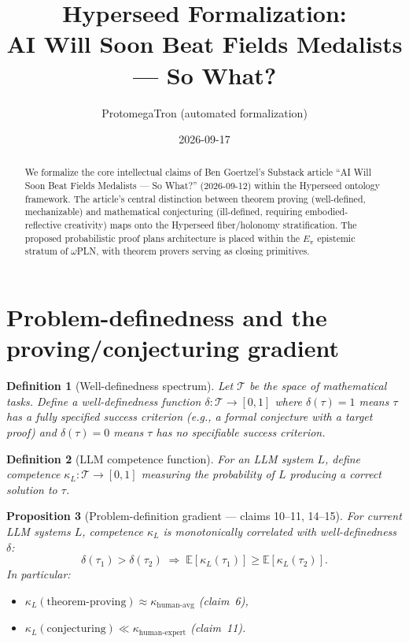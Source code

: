 \documentclass[11pt,a4paper]{article}
\title{Hyperseed Formalization:\\
  AI Will Soon Beat Fields Medalists --- So What?}
\author{ProtomegaTron (automated formalization)}
\date{2026-09-17}
\newtheorem{definition}{Definition}[section]
\newtheorem{proposition}[definition]{Proposition}
\begin{document}
\maketitle

\begin{abstract}
We formalize the core intellectual claims of Ben Goertzel's Substack article
``AI Will Soon Beat Fields Medalists --- So What?'' (2026-09-12) within the
Hyperseed ontology framework. The article's central distinction between
theorem proving (well-defined, mechanizable) and mathematical conjecturing
(ill-defined, requiring embodied-reflective creativity) maps onto the
Hyperseed fiber/holonomy stratification. The proposed probabilistic proof
plans architecture is placed within the $E_\pi$ epistemic stratum of
$\omega$PLN, with theorem provers serving as closing primitives.
\end{abstract}

\tableofcontents

\section{Problem-definedness and the proving/conjecturing gradient}

\begin{definition}[Well-definedness spectrum]
\label{def:well-definedness}
Let $\mathcal{T}$ be the space of mathematical tasks. Define a
\emph{well-definedness function}
$\delta : \mathcal{T} \to [0,1]$
where $\delta(\tau) = 1$ means $\tau$ has a fully specified success
criterion (e.g., a formal conjecture with a target proof) and
$\delta(\tau) = 0$ means $\tau$ has no specifiable success criterion.
\end{definition}

\begin{definition}[LLM competence function]
\label{def:llm-competence}
For an LLM system $L$, define competence
$\kappa_L : \mathcal{T} \to [0,1]$
measuring the probability of $L$ producing a correct solution to $\tau$.
\end{definition}

\begin{proposition}[Problem-definition gradient --- claims 10--11, 14--15]
\label{prop:gradient}
For current LLM systems $L$, competence $\kappa_L$ is monotonically
correlated with well-definedness $\delta$:
\[
  \delta(\tau_1) > \delta(\tau_2) \;\Longrightarrow\;
  \mathbb{E}[\kappa_L(\tau_1)] \geq \mathbb{E}[\kappa_L(\tau_2)].
\]
In particular:
\begin{itemize}
\item $\kappa_L(\text{theorem-proving}) \approx \kappa_{\text{human-avg}}$
      \quad (claim~6),
\item $\kappa_L(\text{conjecturing}) \ll \kappa_{\text{human-expert}}$
      \quad (claim~11).
\end{itemize}
\end{proposition}
\end{document}
